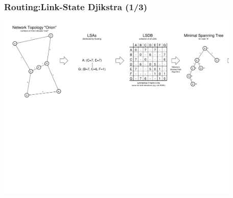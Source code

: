 \documentclass[ignorenonframetext]{beamer}
\begin{document}
\begin{frame}
\frametitle{Routing:Link-State Djikstra (1/3)}
\vspace{1cm}
	\includegraphics[height=9cm]{orion-cost}
\end{frame}
\end{document}
